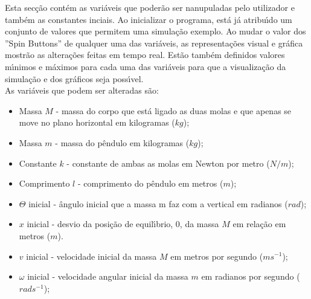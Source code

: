 \documentclass[12pt]{article}
\begin{document}
{
Esta sec\c{c}\~ao cont\'em as vari\'aveis que poder\~ao ser nanupuladas pelo utilizador e tamb\'em as constantes inciais. Ao inicializar o programa, est\'a j\'a atribu\'{\i}do um conjunto de valores que permitem uma simula\c{c}\~ao exemplo. Ao mudar o valor dos ''Spin Buttons'' de qualquer uma das vari\'aveis, as representa\c{c}\~oes visual e gr\'afica  mostr\~ao as altera\c{c}\~oes feitas em tempo real. Est\~ao tamb\'em definidos valores m\'{\i}nimos e m\'aximos para cada uma das vari\'aveis para que a visualiza\c{c}\~ao da simula\c{c}\~ao e dos gr\'aficos seja poss\'{\i}vel.
\\
As vari\'aveis que podem ser alteradas s\~ao:
\begin{itemize}
\item {Massa $M$ - massa do corpo que est\'a ligado as duas molas e que apenas se move no plano horizontal em kilogramas ($kg$);}
\item {Massa $m$ - massa do p\^endulo em kilogramas ($kg$);}
\item {Constante $k$ - constante de ambas as molas em Newton por metro ($N/m$);}
\item {Comprimento $l$ - comprimento do p\^endulo em metros ($m$);}
\item {$\Theta$ inicial - \^angulo inicial que a massa m faz com a vertical em radianos ($rad$);}
\item {$x$ inicial - desvio da posi\c{c}\~ao de equil\'{\i}brio, 0,  da massa $M$ em rela\c{c}\~ao em metros ($m$).}
\item {$v$ inicial - velocidade inicial da massa $M$ em metros por segundo ($ms^{-1}$);}
\item {$\omega$ inicial - velocidade angular inicial da massa $m$ em radianos por segundo ($rads^{-1}$);}
\end{itemize}
}
\end{document}
